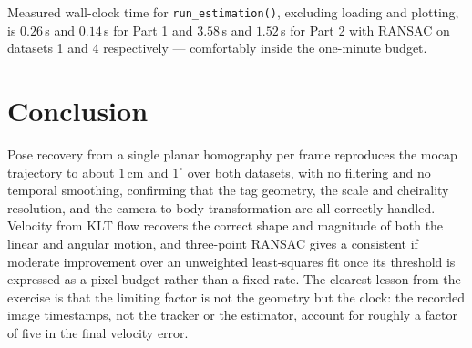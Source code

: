 \documentclass[10pt]{article}
\begin{document}
Measured wall-clock time for \texttt{run\_estimation()}, excluding loading and plotting, is
$0.26\,$s and $0.14\,$s for Part 1 and $3.58\,$s and $1.52\,$s for Part 2 with RANSAC on datasets 1
and 4 respectively --- comfortably inside the one-minute budget.

\section{Conclusion}

Pose recovery from a single planar homography per frame reproduces the mocap trajectory to about
$1\,$cm and $1^\circ$ over both datasets, with no filtering and no temporal smoothing, confirming
that the tag geometry, the scale and cheirality resolution, and the camera-to-body transformation
are all correctly handled. Velocity from KLT flow recovers the correct shape and magnitude of both
the linear and angular motion, and three-point RANSAC gives a consistent if moderate improvement
over an unweighted least-squares fit once its threshold is expressed as a pixel budget rather than a
fixed rate. The clearest lesson from the exercise is that the limiting factor is not the geometry
but the clock: the recorded image timestamps, not the tracker or the estimator, account for roughly
a factor of five in the final velocity error.
\end{document}
